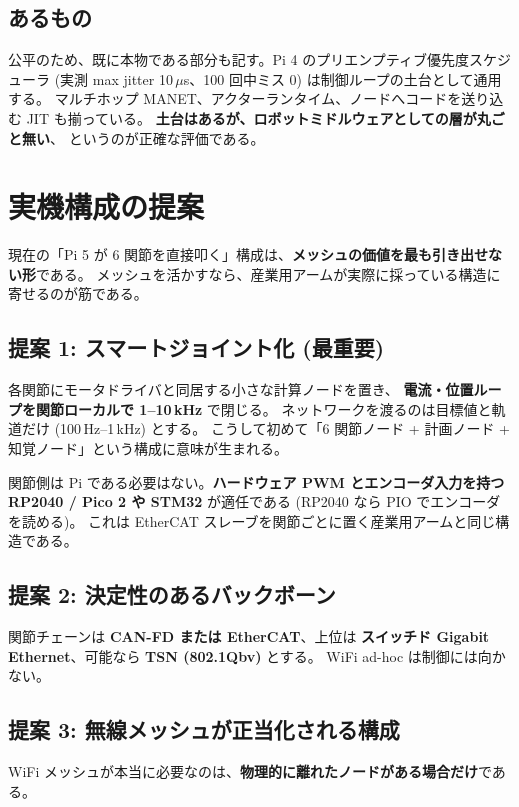\documentclass[11pt,a4paper]{article}
\newcommand{\prob}[1]{\textbf{\textcolor{red!55!black}{#1}}}
\begin{document}
\subsection{あるもの}

公平のため、既に本物である部分も記す。Pi 4 のプリエンプティブ優先度スケジューラ
(実測 max jitter 10\,$\mu$s、100 回中ミス 0) は制御ループの土台として通用する。
マルチホップ MANET、アクターランタイム、ノードへコードを送り込む JIT も揃っている。
\textbf{土台はあるが、ロボットミドルウェアとしての層が丸ごと無い}、
というのが正確な評価である。

\section{実機構成の提案}

現在の「Pi 5 が 6 関節を直接叩く」構成は、\prob{メッシュの価値を最も引き出せない形}である。
メッシュを活かすなら、産業用アームが実際に採っている構造に寄せるのが筋である。

\subsection{提案 1: スマートジョイント化 (最重要)}

各関節にモータドライバと同居する小さな計算ノードを置き、
\textbf{電流・位置ループを関節ローカルで 1--10\,kHz} で閉じる。
ネットワークを渡るのは目標値と軌道だけ (100\,Hz--1\,kHz) とする。
こうして初めて「6 関節ノード + 計画ノード + 知覚ノード」という構成に意味が生まれる。

関節側は Pi である必要はない。\textbf{ハードウェア PWM とエンコーダ入力を持つ
RP2040 / Pico 2 や STM32} が適任である (RP2040 なら PIO でエンコーダを読める)。
これは EtherCAT スレーブを関節ごとに置く産業用アームと同じ構造である。

\subsection{提案 2: 決定性のあるバックボーン}

関節チェーンは \textbf{CAN-FD または EtherCAT}、上位は
\textbf{スイッチド Gigabit Ethernet}、可能なら \textbf{TSN (802.1Qbv)} とする。
WiFi ad-hoc は制御には向かない。

\subsection{提案 3: 無線メッシュが正当化される構成}

WiFi メッシュが本当に必要なのは、\textbf{物理的に離れたノードがある場合だけ}である。
\end{document}
